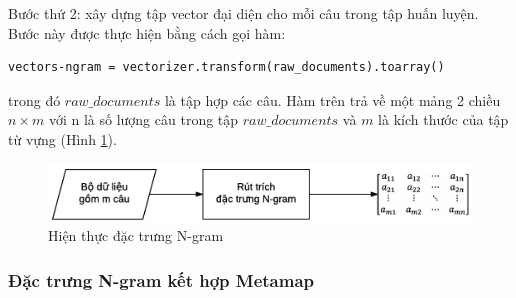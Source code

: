 Bước thứ 2: xây dựng tập vector đại diện cho mỗi câu trong tập huấn luyện. Bước này được thực hiện bằng cách gọi hàm:
\begin{lstlisting}
vectors-ngram = vectorizer.transform(raw_documents).toarray()
\end{lstlisting}
trong đó $raw\_documents$ là tập hợp các câu. Hàm trên trả về một mảng 2 chiều $n \times m$ với n là số lượng câu trong tập $raw\_documents$ và $m$ là kích thước của tập từ vựng (Hình \ref{fig:hien-thuc-ngram}).
\begin{figure}[h]
\centering
\includegraphics[scale=0.8]{../hinh/hien_thuc_ngram.png}
\caption{Hiện thực đặc trưng N-gram} \label{fig:hien-thuc-ngram}
\end{figure}
\subsubsection*{Đặc trưng N-gram kết hợp Metamap}

